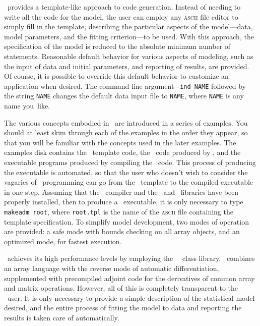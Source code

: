 \documentclass{admbmanual}
\begin{document}
\ADM\ provides a template-like approach to code generation. Instead of needing
to write all the code for the model, the user can employ any \textsc{ascii} file
editor to simply fill in the template, describing the particular aspects of the
model---data, model parameters, and the fitting criterion---to be used. With
this approach, the specification of the model is reduced to the absolute minimum
number of statements. Reasonable default behavior for various aspects of
modeling, such as the input of data and initial parameters, and reporting of
results, are provided. Of course, it is possible to override this default
behavior to customize an application when desired. The command line argument
\texttt{-ind NAME} followed by the string \texttt{NAME} changes the default data
input file to \texttt{NAME}, where \texttt{NAME} is any name you~like.

The various concepts embodied in \ADM\ are introduced in a series of examples.
You should at least skim through each of the examples in the order they appear,
so that you will be familiar with the concepts used in the later examples. The
examples disk contains the \ADM\ template code, the \cplus\ code produced by
\ADM, and the executable programs produced by compiling the \cplus\ code. This
process of producing the executable is automated, so that the user who doesn't
wish to consider the vagaries of \cplus\ programming can go from the \ADM\
template to the compiled executable in one step. Assuming that the \cplus\
compiler and the \ADM\ and \scAD\ libraries have been properly installed, then
to produce a \ADM\ executable, it is only necessary to type \texttt{makeadm
  root}, where \texttt{root.tpl} is the name of the \textsc{ascii} file
containing the template specification. To simplify model development, two modes
of operation are provided: a safe mode with bounds checking on all array
objects, and an optimized mode, for fastest execution.

\ADM\ achieves its high performance levels by employing the \scAD\ \cplus\ class
library. \scAD\ combines an array language with the reverse mode of automatic
differentiation, supplemented with precompiled adjoint code for the derivatives
of common array and matrix operations. However, all of this is completely
transparent to the \ADM\ user. It is only necessary to provide a simple
description of the statistical model desired, and the entire process of fitting
the model to data and reporting the results is taken care of automatically.
\end{document}
